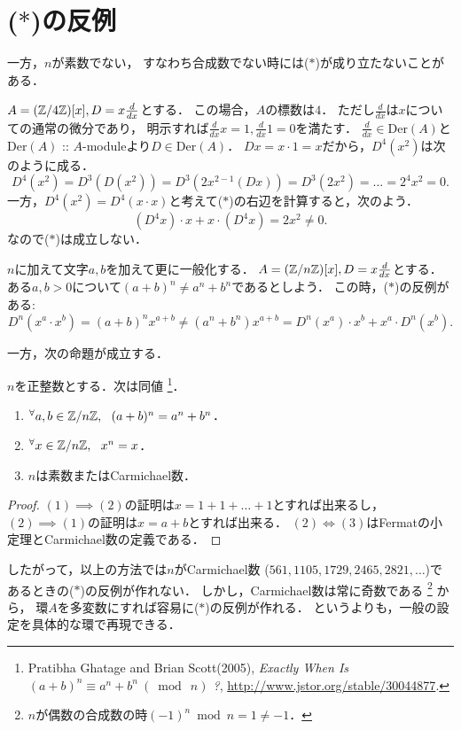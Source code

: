 \documentclass[a4paper]{jsarticle}
\newcommand{\Der}{\mathrm{Der}}
\begin{document}
\section{($*$)の反例}
一方，$n$が素数でない，
すなわち合成数でない時には($*$)が成り立たないことがある．

\begin{Example}
    $A=(\mathbb{Z}/4\mathbb{Z})[x], D=x \frac{d}{dx}$とする．
    この場合，$A$の標数は$4$．
    ただし$\frac{d}{dx}$は$x$についての通常の微分であり，
    明示すれば$\frac{d}{dx} x=1, \frac{d}{dx} 1=0$を満たす．
    $\frac{d}{dx} \in \Der(A)$と$\Der(A)$ :: $A$-moduleより$D \in \Der(A)$．
    $Dx=x \cdot 1=x$だから，$D^4(x^2)$は次のように成る．
    \[ D^4(x^2)=D^3(D(x^2))=D^3(2x^{2-1} (Dx))=D^3(2x^2)=\dots=2^4 x^2=0. \]
    一方，$D^4(x^2)=D^4(x \cdot x)$と考えて($*$)の右辺を計算すると，次のよう．
    \[ (D^4 x) \cdot x+x \cdot (D^4 x)=2x^2 \neq 0. \]
    なので($*$)は成立しない．
\end{Example}

\begin{Example}
    $n$に加えて文字$a,b$を加えて更に一般化する．
    $A=(\mathbb{Z}/n\mathbb{Z})[x], D=x \frac{d}{dx}$とする．
    ある$a,b>0$について$(a+b)^n \neq a^n+b^n$であるとしよう．
    この時，($*$)の反例がある:
    \[ D^n(x^a \cdot x^b)=(a+b)^n x^{a+b} \neq (a^n+b^n)x^{a+b}=D^n(x^a) \cdot x^b+x^a \cdot D^n(x^b). \]
\end{Example}

一方，次の命題が成立する．
\begin{Prop}
    $n$を正整数とする．次は同値
    \footnote
    {
        Pratibha Ghatage and Brian Scott(2005),
        \textit{Exactly When Is $(a + b)^{n} \equiv a^{n} + b^{n} ~(\bmod~ n)$ ?},
        \url{http://www.jstor.org/stable/30044877}.
    }．
    \begin{enumerate}[label=(\arabic*)]
        \item ${}^{\forall} a,b \in \mathbb{Z}/n\mathbb{Z},~~ (a+b)^n=a^n+b^n$．
        \item ${}^{\forall} x \in \mathbb{Z}/n\mathbb{Z},~~ x^n=x$．
        \item $n$は素数またはCarmichael数．
    \end{enumerate}
\end{Prop}
\begin{proof}
    $(1) \implies (2)$の証明は$x=1+1+\dots+1$とすれば出来るし，
    $(2) \implies (1)$の証明は$x=a+b$とすれば出来る．
    $(2) \iff (3)$はFermatの小定理とCarmichael数の定義である．
\end{proof}

したがって，以上の方法では$n$がCarmichael数
($561, 1105, 1729, 2465, 2821, \dots$)であるときの($*$)の反例が作れない．
しかし，Carmichael数は常に奇数である
\footnote{ $n$が偶数の合成数の時$(-1)^{n} \bmod n=1 \neq -1$． }
から，
環$A$を多変数にすれば容易に($*$)の反例が作れる．
というよりも，一般の設定を具体的な環で再現できる．
\end{document}
